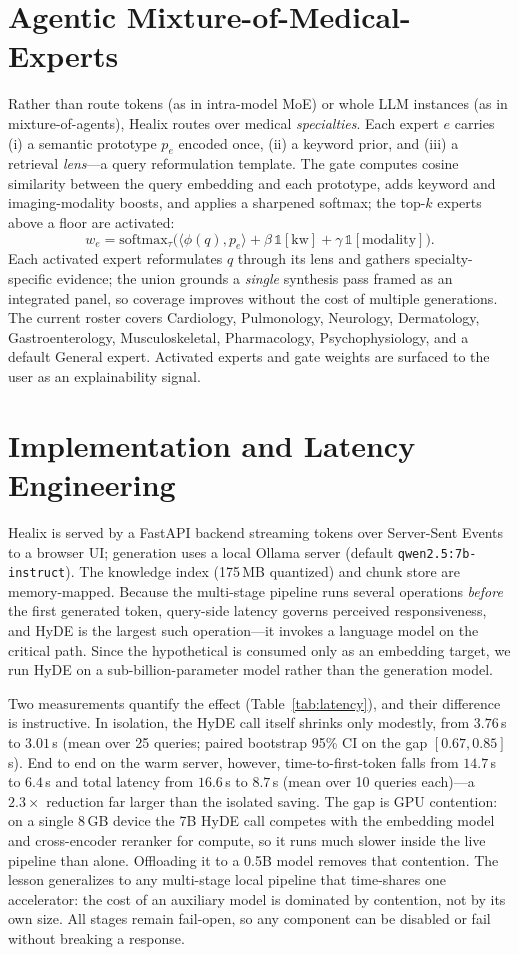 \documentclass[conference]{IEEEtran}
\begin{document}
\section{Agentic Mixture-of-Medical-Experts}\label{sec:moe}
Rather than route tokens (as in intra-model MoE) or whole LLM instances (as in
mixture-of-agents), Healix routes over medical \emph{specialties}. Each expert
$e$ carries (i) a semantic prototype $p_e$ encoded once, (ii) a keyword prior,
and (iii) a retrieval \emph{lens}---a query reformulation template. The gate
computes cosine similarity between the query embedding and each prototype, adds
keyword and imaging-modality boosts, and applies a sharpened softmax; the top-$k$
experts above a floor are activated:
\[
w_e = \mathrm{softmax}_\tau\!\big(\langle \phi(q), p_e\rangle + \beta\,\mathbb{1}[\text{kw}] + \gamma\,\mathbb{1}[\text{modality}]\big).
\]
Each activated expert reformulates $q$ through its lens and gathers
specialty-specific evidence; the union grounds a \emph{single} synthesis pass
framed as an integrated panel, so coverage improves without the cost of multiple
generations. The current roster covers Cardiology, Pulmonology, Neurology,
Dermatology, Gastroenterology, Musculoskeletal, Pharmacology, Psychophysiology,
and a default General expert. Activated experts and gate weights are surfaced to
the user as an explainability signal.

\section{Implementation and Latency Engineering}\label{sec:impl}
Healix is served by a FastAPI backend streaming tokens over Server-Sent Events to
a browser UI; generation uses a local Ollama server (default
\texttt{qwen2.5:7b-instruct}). The knowledge index (175\,MB quantized) and chunk
store are memory-mapped. Because the multi-stage pipeline runs several operations
\emph{before} the first generated token, query-side latency governs perceived
responsiveness, and HyDE is the largest such operation---it invokes a language
model on the critical path. Since the hypothetical is consumed only as an
embedding target, we run HyDE on a sub-billion-parameter model rather than the
generation model.

Two measurements quantify the effect (Table~\ref{tab:latency}), and their
difference is instructive. In isolation, the HyDE call itself shrinks only
modestly, from $3.76$\,s to $3.01$\,s (mean over 25 queries; paired bootstrap
95\% CI on the gap $[0.67, 0.85]$\,s). End to end on the warm server, however,
time-to-first-token falls from $14.7$\,s to $6.4$\,s and total latency from
$16.6$\,s to $8.7$\,s (mean over 10 queries each)---a $2.3\times$ reduction far
larger than the isolated saving. The gap is GPU contention: on a single 8\,GB
device the 7B HyDE call competes with the embedding model and cross-encoder
reranker for compute, so it runs much slower inside the live pipeline than alone.
Offloading it to a 0.5B model removes that contention. The lesson generalizes to
any multi-stage local pipeline that time-shares one accelerator: the cost of an
auxiliary model is dominated by contention, not by its own size. All stages remain
fail-open, so any component can be disabled or fail without breaking a response.
\end{document}
